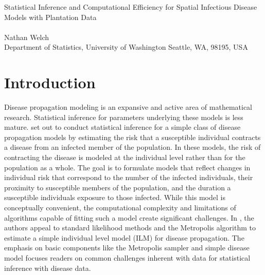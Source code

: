 \documentclass{uwstat572}
\begin{document}

\begin{center}
  {\LARGE Statistical Inference and Computational Efficiency for Spatial Infectious Disease Models with Plantation Data}\\\ \\
  {Nathan Welch \\ 
    Department of Statistics, University of Washington Seattle, WA, 98195, USA
  }
\end{center}

\begin{abstract}
This report examines the findings published in \textit{Statistical inference and computational efficiency for spatial infectious disease models with plantation data} \cite{Brown}. 
This paper aims to conduct statistical inference for parameters associated with a simple individual level infectious disease model. 
Model parameters are estimated using the Metropolis sampling algorithm; however, the computation burden created by fitting even a simple model leads to prohibitively long computation time. 
Statistical and computational methods to overcome the computing challenge are reviewed as a result. 
\end{abstract}

\section{Introduction}

Disease propagation modeling is an expansive and active area of mathematical research.
Statistical inference for parameters underlying these models is less mature.
\cite{Brown} set out to conduct statistical inference for a simple class of disease propagation models by estimating the risk that a susceptible individual contracts a disease from an infected member of the population. 
In these models, the risk of contracting the disease is modeled at the individual level rather than for the population as a whole. 
The goal is to formulate models that reflect changes in individual risk that correspond to the number of the infected individuals, their proximity to susceptible members of the population, and the duration a susceptible individuals  exposure to those infected. 
While this model is conceptually convenient, the computational complexity and limitations of algorithms capable of fitting such a model create significant challenges.
In \cite{Brown}, the authors appeal to standard likelihood methods and the Metropolis algorithm to estimate a simple individual level model (ILM) for disease propagation.
The emphasis on basic components like the Metropolis sampler and simple disease model focuses readers on common challenges inherent with data for statistical inference with disease data. 
\end{document}
